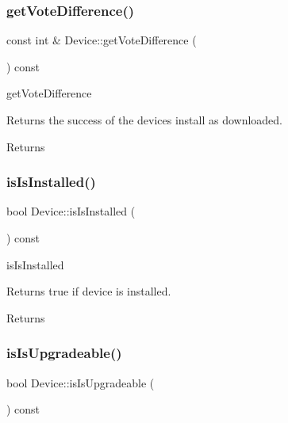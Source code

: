 \subsubsection{\texorpdfstring{get\+Vote\+Difference()}{getVoteDifference()}}
{\footnotesize\ttfamily const int \& Device\+::get\+Vote\+Difference (\begin{DoxyParamCaption}{ }\end{DoxyParamCaption}) const}



get\+Vote\+Difference 

Returns the success of the device\textquotesingle{}s install as downloaded. \begin{DoxyReturn}{Returns}

\end{DoxyReturn}
\mbox{\label{classDevice_a697feb57b759c13cb1b56f004e61229b}} 
\subsubsection{\texorpdfstring{is\+Is\+Installed()}{isIsInstalled()}}
{\footnotesize\ttfamily bool Device\+::is\+Is\+Installed (\begin{DoxyParamCaption}{ }\end{DoxyParamCaption}) const\hspace{0.3cm}{\ttfamily [inline]}}



is\+Is\+Installed 

Returns true if device is installed. \begin{DoxyReturn}{Returns}

\end{DoxyReturn}
\mbox{\label{classDevice_afe6f638cc2bcc512f5bc1f2fef39fe88}} 
\subsubsection{\texorpdfstring{is\+Is\+Upgradeable()}{isIsUpgradeable()}}
{\footnotesize\ttfamily bool Device\+::is\+Is\+Upgradeable (\begin{DoxyParamCaption}{ }\end{DoxyParamCaption}) const\hspace{0.3cm}{\ttfamily [inline]}}



